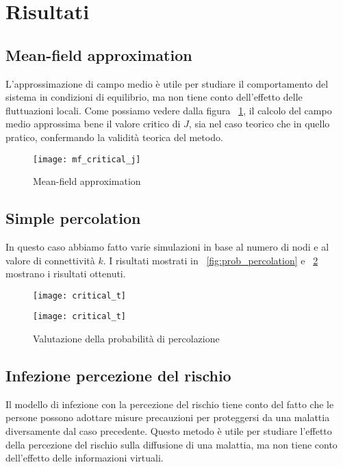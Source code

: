 \section{Risultati}\label{sec:risultati}

\subsection{Mean-field approximation}\label{subsec:res-mean-field-approximation}
    L'approssimazione di campo medio è utile per studiare il comportamento del sistema in condizioni di 
    equilibrio, ma non tiene conto dell'effetto delle fluttuazioni locali.
    Come possiamo vedere dalla figura ~\ref{fig:mf_critical_j}, il calcolo del campo medio approssima bene il valore
    critico di $J$, sia nel caso teorico che in quello pratico, confermando la validità teorica del metodo.

    \begin{figure}[h]
        \texttt{[image: mf\_critical\_j]}\caption{Mean-field approximation}
        \label{fig:mf_critical_j}
    \end{figure}

\subsection{Simple percolation}\label{subsec:res-simple-percolation}
    In questo caso abbiamo fatto varie simulazioni in base al numero di nodi e al valore di connettività $k$.
    I risultati mostrati in ~\ref{fig:prob_percolation} e ~\ref{fig:prob_percolation_2} mostrano i risultati ottenuti.

    \begin{figure}[h]
        \begin{minipage}{0.5\textwidth}
            \texttt{[image: critical\_t]}\label{fig:prob_percolation}
        \end{minipage}
        \begin{minipage}{0.5\textwidth}
            \texttt{[image: critical\_t]}\label{fig:prob_percolation_2}
        \end{minipage}
        \caption{Valutazione della probabilità di percolazione}
    \end{figure}

\subsection{Infezione percezione del rischio}\label{subsec:res-infezione-con-la-percezione-del-rischio}
    Il modello di infezione con la percezione del rischio tiene conto del fatto che le persone possono adottare misure
    precauzioni per proteggersi da una malattia diversamente dal caso precedente.
    Questo metodo è utile per studiare l'effetto della percezione del rischio sulla diffusione di una malattia, ma non
    tiene conto dell'effetto delle informazioni virtuali.


